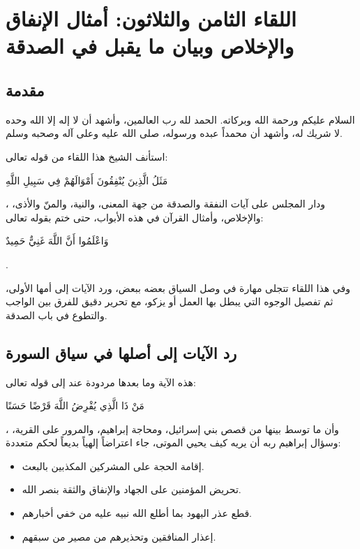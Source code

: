 \chapter{اللقاء الثامن والثلاثون: أمثال الإنفاق والإخلاص وبيان ما يقبل في الصدقة}

\section{مقدمة}
السلام عليكم ورحمة الله وبركاته. الحمد لله رب العالمين، وأشهد أن لا إله إلا الله وحده لا شريك له، وأشهد أن محمداً عبده ورسوله، صلى الله عليه وعلى آله وصحبه وسلم.

استأنف الشيخ هذا اللقاء من قوله تعالى: \begin{ayah}مَثَلُ الَّذِينَ يُنْفِقُونَ أَمْوَالَهُمْ فِي سَبِيلِ اللَّهِ\end{ayah}، ودار المجلس على آيات النفقة والصدقة من جهة المعنى، والنية، والمنّ والأذى، والإخلاص، وأمثال القرآن في هذه الأبواب، حتى ختم بقوله تعالى: \begin{ayah}وَاعْلَمُوا أَنَّ اللَّهَ غَنِيٌّ حَمِيدٌ\end{ayah}.

وفي هذا اللقاء تتجلى مهارة  في وصل السياق بعضه ببعض، ورد الآيات إلى أمها الأولى، ثم تفصيل الوجوه التي يبطل بها العمل أو يزكو، مع تحرير دقيق للفرق بين الواجب والتطوع في باب الصدقة.

\separator

\section{رد الآيات إلى أصلها في سياق السورة}
 هذه الآية وما بعدها مردودة عند  إلى قوله تعالى: \begin{ayah}مَنْ ذَا الَّذِي يُقْرِضُ اللَّهَ قَرْضًا حَسَنًا\end{ayah}، وأن ما توسط بينها من قصص بني إسرائيل، ومحاجة إبراهيم، والمرور على القرية، وسؤال إبراهيم ربه أن يريه كيف يحيي الموتى، جاء اعتراضاً إلهياً بديعاً لحكم متعددة:
\begin{itemize}
    \item إقامة الحجة على المشركين المكذبين بالبعث.
    \item تحريض المؤمنين على الجهاد والإنفاق والثقة بنصر الله.
    \item قطع عذر اليهود بما أطلع الله نبيه عليه من خفي أخبارهم.
    \item إعذار المنافقين وتحذيرهم من مصير من سبقهم.
\end{itemize}


